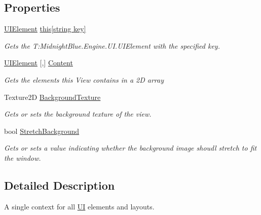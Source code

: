 \subsection*{Properties}
\begin{DoxyCompactItemize}
\item 
\hyperlink{class_midnight_blue_1_1_engine_1_1_u_i_1_1_u_i_element}{U\+I\+Element} \hyperlink{class_midnight_blue_1_1_engine_1_1_u_i_1_1_u_i_view_a99db2ffa2be79afc3a2daca105c6eb98}{this\mbox{[}string key\mbox{]}}
\begin{DoxyCompactList}\small\item\em Gets the T\+:\+Midnight\+Blue.\+Engine.\+U\+I.\+U\+I\+Element with the specified key. \end{DoxyCompactList}\item 
\hyperlink{class_midnight_blue_1_1_engine_1_1_u_i_1_1_u_i_element}{U\+I\+Element} \mbox{[},\mbox{]} \hyperlink{class_midnight_blue_1_1_engine_1_1_u_i_1_1_u_i_view_afa135eeb28b11055b98404ae9090f9c9}{Content}
\begin{DoxyCompactList}\small\item\em Gets the elements this View contains in a 2D array \end{DoxyCompactList}\item 
Texture2D \hyperlink{class_midnight_blue_1_1_engine_1_1_u_i_1_1_u_i_view_ab4edda3ba89c275a7ba619eba97fc244}{Background\+Texture}
\begin{DoxyCompactList}\small\item\em Gets or sets the background texture of the view. \end{DoxyCompactList}\item 
bool \hyperlink{class_midnight_blue_1_1_engine_1_1_u_i_1_1_u_i_view_ab7cdc0c4026c631e292bf2a33cded169}{Stretch\+Background}
\begin{DoxyCompactList}\small\item\em Gets or sets a value indicating whether the background image shoudl stretch to fit the window. \end{DoxyCompactList}\end{DoxyCompactItemize}


\subsection{Detailed Description}
A single context for all \hyperlink{namespace_midnight_blue_1_1_engine_1_1_u_i}{UI} elements and layouts. 



